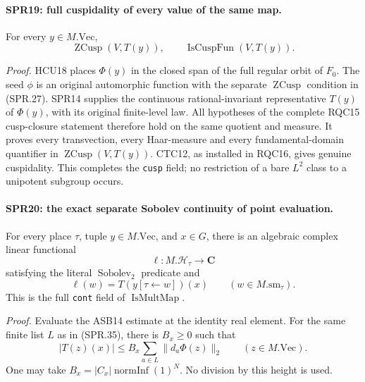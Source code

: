 \paragraph{SPR19: full cuspidality of every value of the same map.}
\label{claim:SPR19}
For every \(y\in M.\mathrm{Vec}\),
\[
             \operatorname{ZCusp}(V,T(y)),
                       \qquad \operatorname{IsCuspFun}(V,T(y)).
 \tag{SPR.37}
\]

\emph{Proof.}
HCU18 places \(\Phi(y)\) in the closed span of the full regular
orbit of \(F_0\).
The seed \(\phi\) is an original automorphic function with the
separate \(\operatorname{ZCusp}\) condition in (SPR.27).
SPR14 supplies the continuous rational-invariant representative
\(T(y)\) of \(\Phi(y)\), with its original finite-level law.
All hypotheses of the complete RQC15 cusp-closure statement
therefore hold on the same quotient and measure.
It proves every transvection, every Haar-measure and every
fundamental-domain quantifier in
\(\operatorname{ZCusp}(V,T(y))\).
CTC12, as installed in RQC16, gives genuine cuspidality.
This completes the \texttt{cusp} field; no restriction of a
bare \(L^2\) class to a unipotent subgroup occurs.

\paragraph{SPR20: the exact separate Sobolev continuity of point evaluation.}
\label{claim:SPR20}
For every place \(\tau\), tuple \(y\in M.\mathrm{Vec}\), and
\(x\in G\), there is an algebraic complex linear functional
\[
                   \ell:M.\mathcal H_\tau\longrightarrow\mathbf C
\]
satisfying the literal \(\operatorname{Sobolev}_2\) predicate and
\[
                    \ell(w)=T(y[\tau\leftarrow w])(x)
                        \qquad(w\in M.\mathrm{sm}_\tau).
 \tag{SPR.38}
\]
This is the full \texttt{cont} field of
\(\operatorname{IsMultMap}\).

\emph{Proof.}
Evaluate the ASB14 estimate at the identity real element.
For the same finite list \(L\) as in (SPR.35), there is \(B_x\ge0\)
such that
\[
             |T(z)(x)|\le B_x
                         \sum_{a\in L}\|d_a\Phi(z)\|_2
                           \qquad(z\in M.\mathrm{Vec}).
 \tag{SPR.39}
\]
One may take \(B_x=|C_x|\operatorname{normInf}(1)^N\).
No division by this height is used.

